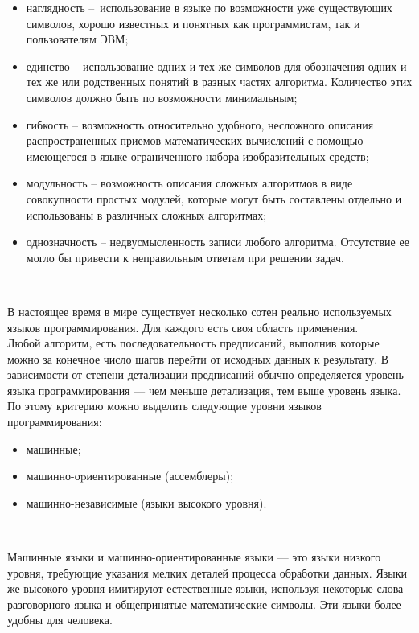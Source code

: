 \begin{itemize}
  \item наглядность – использование в языке по возможности уже существующих символов, хорошо известных и понятных как программистам, так и пользователям ЭВМ;
  \item единство – использование одних и тех же символов для обозначения одних и тех же или родственных понятий в разных частях алгоритма. Количество этих символов должно быть по возможности минимальным;
  \item гибкость – возможность относительно удобного, несложного описания распространенных приемов математических вычислений с помощью имеющегося в языке ограниченного набора изобразительных средств;
  \item модульность – возможность описания сложных алгоритмов в виде совокупности простых модулей, которые могут быть составлены отдельно и использованы в различных сложных алгоритмах;
  \item однозначность – недвусмысленность записи любого алгоритма. Отсутствие ее могло бы привести к неправильным ответам при решении задач.
\end{itemize}
\

В настоящее время в мире существует несколько сотен реально используемых языков программирования. Для каждого есть своя область применения. \\

Любой алгоритм, есть последовательность предписаний, выполнив которые можно за конечное число шагов перейти от исходных данных к результату. В зависимости от степени детализации предписаний обычно определяется уровень языка программирования — чем меньше детализация, тем выше уровень языка. \\

По этому критерию можно выделить следующие уровни языков программирования: \\

\begin{itemize}
  \item машинные;
  \item машинно-оpиентиpованные (ассемблеры);
  \item машинно-независимые (языки высокого уровня).
\end{itemize}
\

Машинные языки и машинно-ориентированные языки — это языки низкого уровня, требующие указания мелких деталей процесса обработки данных. Языки же высокого уровня имитируют естественные языки, используя некоторые слова разговорного языка и общепринятые математические символы. Эти языки более удобны для человека. \\

